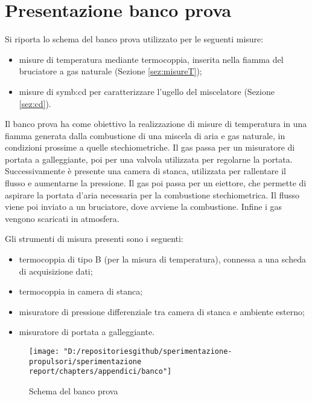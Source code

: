\section{Presentazione banco prova}\label{app:banco}
Si riporta lo schema del banco prova utilizzato per le seguenti misure:
\begin{itemize}
	\item misure di temperatura mediante termocoppia, inserita nella fiamma del
	bruciatore a gas naturale (Sezione \ref{sez:misureT});
	\item misure di \gls{symb:cd} per caratterizzare l'ugello del miscelatore (Sezione \ref{sez:cd}).
\end{itemize}

Il banco prova ha come obiettivo la realizzazione di misure di temperatura in una fiamma generata dalla combustione di una miscela di aria e gas naturale, in condizioni prossime a quelle stechiometriche. 
Il gas passa per un misuratore di portata a galleggiante, poi per una valvola utilizzata per regolarne la portata. Successivamente è presente una camera di stanca, utilizzata per rallentare il flusso e aumentarne la pressione. Il gas poi passa per un eiettore, che permette di aspirare la portata d'aria necessaria per la combustione stechiometrica. Il flusso viene poi inviato a un bruciatore, dove avviene la combustione. Infine i gas vengono scaricati in atmosfera. 

Gli strumenti di misura presenti sono i seguenti:
\begin{itemize}
	\item termocoppia di tipo B (per la misura di temperatura), connessa a una scheda di acquisizione dati;
	\item termocoppia in camera di stanca;
	\item misuratore di pressione differenziale tra camera di stanca e ambiente esterno;
	\item misuratore di portata a galleggiante.
\end{itemize}
\begin{figure}[H]
	\centering
	\texttt{[image: "D:/repositoriesgithub/sperimentazione-propulsori/sperimentazione report/chapters/appendici/banco"]}
	\caption{Schema del banco prova}
	\label{fig:banco}
\end{figure}

